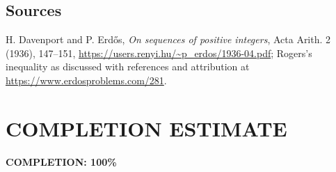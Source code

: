 \subsection{Sources}
H. Davenport and P. Erd\H{o}s, \emph{On sequences of positive integers}, Acta Arith. 2 (1936), 147--151, \url{https://users.renyi.hu/~p_erdos/1936-04.pdf}; Rogers's inequality as discussed with references and attribution at \url{https://www.erdosproblems.com/281}.
\section{COMPLETION ESTIMATE}
\textbf{COMPLETION: 100\%}
